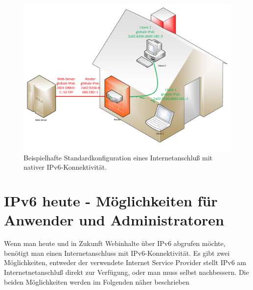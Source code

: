 \documentclass[a4paper,12pt]{scrartcl}
\begin{document}
\begin{figure}[htb]
\begin{center}
 \includegraphics[width=.8\hsize]{./Zeichnungen/IPv6.pdf}
 \end{center}
\caption[Beispielhafte Standardkonfiguration eines Internetanschlu\ss{} mit nativer IPv6-Konnektivit\"at, Quelle: Autor, verwendete Symbole unterliegen der
GPL]{\label{stdinet}Beispielhafte Standardkonfiguration eines Internetanschlu\ss{} mit nativer IPv6-Konnektivit\"at.}
\end{figure}

\clearpage
\section{IPv6 heute - Möglichkeiten für Anwender und Administratoren}
Wenn man heute und in Zukunft Webinhalte \"uber IPv6 abgrufen m\"ochte, ben\"otigt man einen Internetanschluss mit IPv6-Konnektivit\"at. Es gibt zwei M\"oglichkeiten, entweder der verwendete Internet Service Provider stellt IPv6 am Internetnetanschlu{\ss} direkt zur Verf\"ugung, oder man muss selbst nachbessern. Die beiden M\"oglichkeiten werden im Folgenden n\"aher beschrieben
\end{document}

